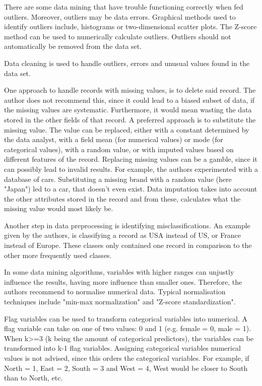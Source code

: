There are some data mining that have trouble functioning correctly when fed outliers. Moreover, outliers may be data errors. Graphical methods used to identify outliers include, histograms or two-dimensional scatter plots.
The Z-score method can be used to numerically calculate outliers. Outliers should not automatically be removed from the data set.

Data cleaning is used to handle outliers, errors and unusual values found in the data set.

One approach to handle records with missing values, is to delete said record. The author does not recommend this, since it could lead to a biased subset of data, if the missing values are systematic. Furthermore, it would mean wasting the data stored in the other fields of that record. A preferred approach is to substitute the missing value. The value can be replaced, either with a constant determined by the data analyst, with a field mean (for numerical values) or mode (for categorical values), with a random value, or with imputed values based on different features of the record. Replacing missing values can be a gamble, since it can possibly lead to invalid results. For example, the authors experimented with a database of cars. Substituting a missing brand with a random value (here "Japan") led to a car, that doesn't even exist. Data imputation takes into account the other attributes stored in the record and from these, calculates what the missing value would most likely be.

Another step in data preprocessing is identifying misclassifications. An example given by the authors, is classifying a record as USA instead of US, or France instead of Europe. These classes only contained one record in comparison to the other more frequently used classes.


In some data mining algorithms, variables with higher ranges can unjustly influence the results, having more influence than smaller ones. Therefore, the authors recommend to normalise numerical data. Typical normalisation techniques include "min-max normalization" and "Z-score standardization".

Flag variables can be used to transform categorical variables into numerical. A flag variable can take on one of two values: 0 and 1 (e.g. female = 0, male = 1). When k>=3 (k being the amount of categorical predictors), the variables can be transformed into k-1 flag variables. Assigning categorical variables numerical values is not advised, since this orders the categorical variables. For example, if North = 1, East = 2, South = 3 and West = 4, West would be closer to South than to North, etc.

